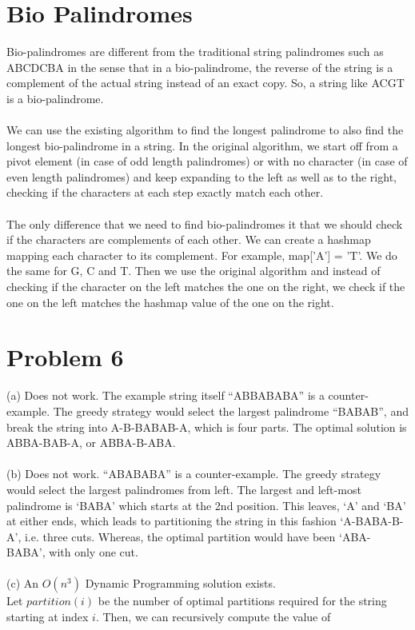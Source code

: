\documentclass{article}
\begin{document}
\section{Bio Palindromes}
Bio-palindromes are different from the traditional string palindromes such as ABCDCBA in the sense that in a bio-palindrome, the reverse of the string is a complement of the actual string instead of an exact copy. So, a string like ACGT is a bio-palindrome. \\
\\
We can use the existing algorithm to find the longest palindrome to also find the longest bio-palindrome in a string. In the original algorithm, we start off from a pivot element (in case of odd length palindromes) or with no character (in case of even length palindromes) and keep expanding to the left as well as to the right, checking if the characters at each step exactly match each other. \\
\\
The only difference that we need to find bio-palindromes it that we should check if the characters are complements of each other. We can create a hashmap mapping each character to its complement. For example, map['A'] = 'T'. We do the same for G, C and T. Then we use the original algorithm and instead of checking if the character on the left matches the one on the right, we check if the one on the left matches the hashmap value of the one on the right. 
\clearpage

\section{Problem 6}
(a) Does not work. The example string itself “ABBABABA” is a 
counter-example. The greedy strategy would select the largest 
palindrome “BABAB”, and break the string into A-B-BABAB-A, 
which is four parts. The optimal solution is ABBA-BAB-A, or ABBA-B-ABA.\\
\\
(b) Does not work. “ABABABA” is a counter-example. The greedy strategy 
would select the largest palindromes from left. The largest and left-most
palindrome is `BABA' which starts at the 2nd position. This leaves, `A' and
`BA' at either ends, which leads to partitioning the string in this fashion
`A-BABA-B-A', i.e. three cuts. Whereas, the optimal partition would have
been `ABA-BABA', with only one cut.\\
\\
(c) An {$ O(n^3) $} Dynamic Programming solution exists.\\
Let $partition(i)$ be the number of optimal partitions required for the string starting at index $i$. Then, we can recursively compute the value of 
\end{document}
